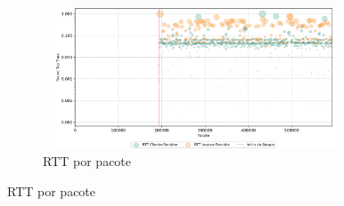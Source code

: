 \begin{apendicesenv}
\begin{figure}[htbp!]
\begin{subfigure}[t]{0.5\textwidth}
    \end{subfigure}%
    ~
    \begin{subfigure}[t]{0.5\textwidth}
        \centering
        \caption{RTT por pacote}
        \includegraphics[width=1\textwidth, height=120pt]{USPSC-img/output/cropped/1-mitm_port-rttp.png}
    \end{subfigure}%
\end{figure}


\end{apendicesenv}
